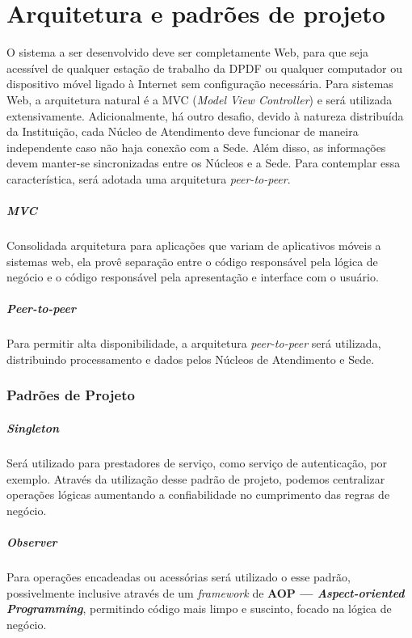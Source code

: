 \documentclass[12pt,a4paper]{report}
\begin{document}
\chapter{Arquitetura e padrões de projeto}

O sistema a ser desenvolvido deve ser completamente Web, para que seja acessível de qualquer estação de trabalho da DPDF ou qualquer computador ou dispositivo móvel ligado à Internet sem configuração necessária. Para sistemas Web, a arquitetura natural é a MVC (\textit{Model View Controller}) e será utilizada extensivamente. Adicionalmente, há outro desafio, devido à natureza distribuída da Instituição, cada Núcleo de Atendimento deve funcionar de maneira independente caso não haja conexão com a Sede. Além disso, as informações devem manter-se sincronizadas entre os Núcleos e a Sede. Para contemplar essa característica, será adotada uma arquitetura \textit{peer-to-peer}.

\paragraph{MVC} Consolidada arquitetura para aplicações que variam de aplicativos móveis a sistemas web, ela provê separação entre o código responsável pela lógica de negócio e o código responsável pela apresentação e interface com o usuário.

\paragraph{\textit{Peer-to-peer}} Para permitir alta disponibilidade, a arquitetura \textit{peer-to-peer} será utilizada, distribuindo processamento e dados pelos Núcleos de Atendimento e Sede.

\subsection*{Padrões de Projeto}

\paragraph{\textit{Singleton}} Será utilizado para prestadores de serviço, como serviço de autenticação, por exemplo. Através da utilização desse padrão de projeto, podemos centralizar operações lógicas aumentando a confiabilidade no cumprimento das regras de negócio.

\paragraph{\textit{Observer}} Para operações encadeadas ou acessórias será utilizado o esse padrão, possivelmente inclusive através de um \textit{framework} de \textbf{AOP --- \textit{Aspect-oriented Programming}}, permitindo código mais limpo e suscinto, focado na lógica de negócio.
\end{document}
